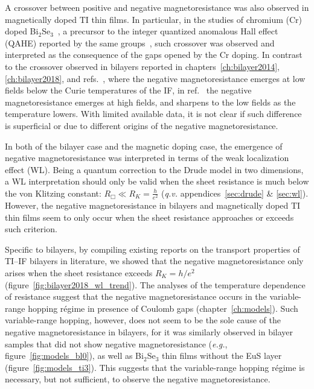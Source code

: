 A crossover between positive and negative magnetoresistance was also observed in magnetically doped TI thin films. In particular, in the studies of chromium (Cr) doped Bi$_2$Se$_3$~\cite{Cr_doped}, a precursor to the integer quantized anomalous Hall effect (QAHE) reported by the same groups~\cite{Chang2013}, such crossover was observed and interpreted as the consequence of the gaps opened by the Cr doping. In contrast to the crossover observed in bilayers reported in chapters~\ref{ch:bilayer2014}, \ref{ch:bilayer2018}, and refs.~\cite{Samarth2017, Tian2016}, where the negative magnetoresistance emerges at low fields below the Curie temperatures of the IF, in ref.~\cite{Cr_doped} the negative magnetoresistance emerges at high fields, and sharpens to the low fields as the temperature lowers. With limited available data, it is not clear if such difference is superficial or due to different origins of the negative magnetoresistance.

In both of the bilayer case and the magnetic doping case, the emergence of negative magnetoresistance was interpreted in terms of the weak localization effect (WL). Being a quantum correction to the Drude model in two dimensions, a WL interpretation should only be valid when the sheet resistance is much below the von Klitzing constant: $R_\Box \ll R_K = \frac{h}{e^2}$ (\textit{q.v.} appendices~\ref{sec:drude} \& \ref{sec:wl}). However, the negative magnetoresistance in bilayers and magnetically doped TI thin films seem to only occur when the sheet resistance approaches or exceeds such criterion.

Specific to bilayers, by compiling existing reports on the transport properties of TI--IF bilayers in literature, we showed that the negative magnetoresistance only arises when the sheet resistance exceeds $R_K = h / e^2$ (figure~\ref{fig:bilayer2018_wl_trend}). The analyses of the temperature dependence of resistance suggest that the negative magnetoresistance occurs in the variable-range hopping r\'egime in presence of Coulomb gaps (chapter~\ref{ch:models}). Such variable-range hopping, however, does not seem to be the sole cause of the negative magnetoresistance in bilayers, for it was similarly observed in bilayer samples that did not show negative magnetoresistance (\textit{e.g.}, figure~\ref{fig:models_bl0}), as well as Bi$_2$Se$_3$ thin films without the EuS layer (figure~\ref{fig:models_ti3}). This suggests that the variable-range hopping r\'egime is necessary, but not sufficient, to observe the negative magnetoresistance.
%
